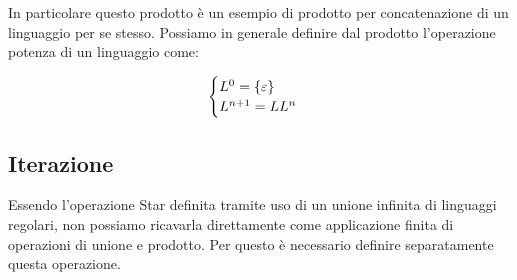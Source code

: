In particolare questo prodotto è un esempio di prodotto per concatenazione di un linguaggio per se stesso. Possiamo in generale definire dal prodotto l'operazione potenza di un linguaggio come:

\begin{equation}
  \begin{cases}
    L^0=\displaystyle{\left\{{\varepsilon}\right\}}\\
    L^{n+1}=LL^n
  \end{cases}
\end{equation}

\subsection{Iterazione}


Essendo l'operazione Star definita tramite uso di un unione infinita di linguaggi regolari, non possiamo ricavarla direttamente come applicazione finita di operazioni di unione e prodotto. Per questo è necessario definire separatamente questa operazione.

